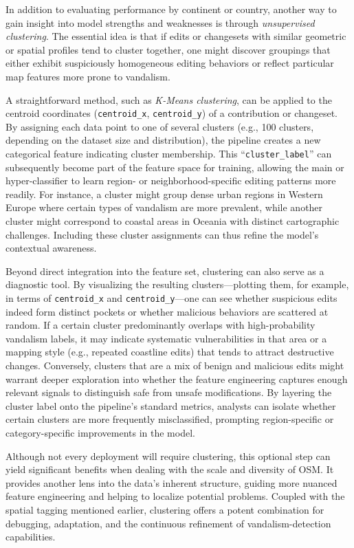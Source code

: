 \documentclass[
    13pt, %
    a4paper, %
    twoside, 
    DIV14, %
    listof=totoc, %
    bibliography=totoc, %
    index=totoc, %
    headsepline
]{scrreprt}
\begin{document}
In addition to evaluating performance by continent or country, another way to gain insight into model strengths and weaknesses is through \emph{unsupervised clustering}. The essential idea is that if edits or changesets with similar geometric or spatial profiles tend to cluster together, one might discover groupings that either exhibit suspiciously homogeneous editing behaviors or reflect particular map features more prone to vandalism.

A straightforward method, such as \emph{K-Means clustering}, can be applied to the centroid coordinates (\texttt{centroid\_x}, \texttt{centroid\_y}) of a contribution or changeset. By assigning each data point to one of several clusters (e.g., 100 clusters, depending on the dataset size and distribution), the pipeline creates a new categorical feature indicating cluster membership. This “\texttt{cluster\_label}” can subsequently become part of the feature space for training, allowing the main or hyper-classifier to learn region- or neighborhood-specific editing patterns more readily. For instance, a cluster might group dense urban regions in Western Europe where certain types of vandalism are more prevalent, while another cluster might correspond to coastal areas in Oceania with distinct cartographic challenges. Including these cluster assignments can thus refine the model’s contextual awareness.

Beyond direct integration into the feature set, clustering can also serve as a diagnostic tool. By visualizing the resulting clusters—plotting them, for example, in terms of \texttt{centroid\_x} and \texttt{centroid\_y}—one can see whether suspicious edits indeed form distinct pockets or whether malicious behaviors are scattered at random. If a certain cluster predominantly overlaps with high-probability vandalism labels, it may indicate systematic vulnerabilities in that area or a mapping style (e.g., repeated coastline edits) that tends to attract destructive changes. Conversely, clusters that are a mix of benign and malicious edits might warrant deeper exploration into whether the feature engineering captures enough relevant signals to distinguish safe from unsafe modifications. By layering the cluster label onto the pipeline’s standard metrics, analysts can isolate whether certain clusters are more frequently misclassified, prompting region-specific or category-specific improvements in the model.

Although not every deployment will require clustering, this optional step can yield significant benefits when dealing with the scale and diversity of OSM. It provides another lens into the data’s inherent structure, guiding more nuanced feature engineering and helping to localize potential problems. Coupled with the spatial tagging mentioned earlier, clustering offers a potent combination for debugging, adaptation, and the continuous refinement of vandalism-detection capabilities.
\end{document}
